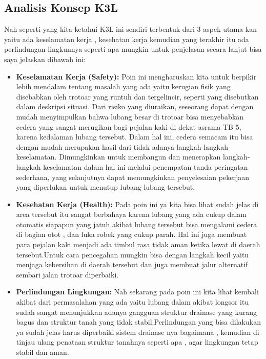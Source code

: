\documentclass[a4paper, 12pt]{article}
\begin{document}
\subsection{Analisis Konsep K3L}
Nah seperti yang kita ketahui K3L ini sendiri terbentuk dari 3 aspek utama kan yaitu ada keselamatan kerja , kesehatan kerja kemudian yang terakhir itu ada perlindungan lingkunnya seperti apa mungkin untuk penjelasan secara lanjut bisa saya jelaskan dibawah ini:
\begin{itemize}
    \item \textbf{Keselamatan Kerja (Safety):} Poin ini mengharuskan kita untuk berpikir lebih mendalam tentang masalah yang ada yaitu kerugian fisik yang disebabkan oleh trotoar yang runtuh dan tergelincir, seperti yang disebutkan dalam deskripsi situasi. Dari risiko yang diuraikan, seseorang dapat dengan mudah menyimpulkan bahwa lubang besar di trotoar bisa menyebabkan cedera yang sangat merugikan bagi pejalan kaki di dekat asrama TB 5, karena kedalaman lubang tersebut. Dalam hal ini, cedera semacam itu bisa dengan mudah merupakan hasil dari tidak adanya langkah-langkah keselamatan. Dimungkinkan untuk membangun dan menerapkan langkah-langkah keselamatan dalam hal ini melalui penempatan tanda peringatan sederhana, yang selanjutnya dapat memungkinkan penyelesaian pekerjaan yang diperlukan untuk menutup lubang-lubang tersebut.


    \item \textbf{Kesehatan Kerja (Health):} Pada poin ini ya kita bisa lihat sudah jelas di area tersebut itu sangat berbahaya karena lubang yang ada cukup dalam otomatis siapapun yang jatuh akibat lubang tersebut bisa mengalami cedera di bagian otot , dan luka robek yang cukup parah. Hal ini juga membuat para pejalan kaki menjadi ada timbul rasa tidak aman ketika lewat di daerah tersebut.Untuk cara pencegahan mungkin bisa dengan langkah kecil yaitu menjaga kebersihan di daerah tersebut dan juga membuat jalur alternatif sembari jalan trotoar diperbaiki.
    \item \textbf{Perlindungan Lingkungan:} Nah sekarang pada poin ini kita lihat kembali akibat dari permasalahan yang ada yaitu lubang dalam akibat longsor itu sudah sangat menunjukkan adanya gangguan struktur drainase yang kurang bagus dan struktur tanah yang tidak stabil.Perlindungan yang bisa dilakukan ya sudah jelas harus diperbaiki sistem drainase nya bagaimana , kemudian di tinjau ulang penataan struktur tanahnya seperti apa , agar lingkungan tetap stabil dan aman.
\end{itemize}
\end{document}
